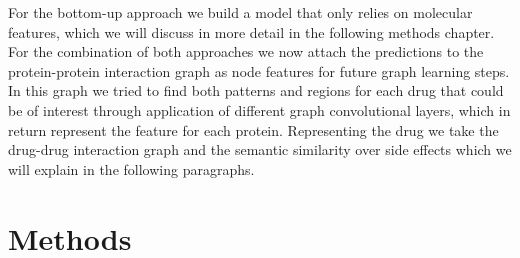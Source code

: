 \documentclass{bioinfo}
\begin{document}
For the bottom-up approach we build a model that only relies on molecular features, which we will discuss in more detail in the following methods chapter. For the combination of both approaches we now attach the predictions to the protein-protein interaction graph as node features for future graph learning steps. In this graph we tried to find both patterns and regions for each drug that could be of interest through application of different graph convolutional layers, which in return represent the feature for each protein. Representing the drug we take the drug-drug interaction graph and the semantic similarity over side effects which we will explain in the following paragraphs.

\section{Methods}
\end{document}
